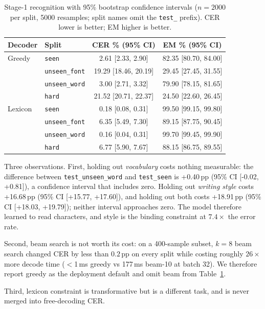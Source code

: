 \documentclass[conference]{IEEEtran}
\begin{document}
\begin{table}[t]
\caption{Stage-1 recognition with 95\% bootstrap confidence intervals
($n=2000$ per split, 5000 resamples; split names omit the \texttt{test\_}
prefix). CER lower is better; EM higher is better.}
\label{tab:stage1}
\centering
\footnotesize
\setlength{\tabcolsep}{3.5pt}
\begin{tabular}{@{}llcc@{}}
\toprule
Decoder & Split & CER \% (95\% CI) & EM \% (95\% CI) \\
\midrule
Greedy
 & \texttt{seen} & 2.61 [2.33, 2.90] & 82.35 [80.70, 84.00] \\
 & \texttt{unseen\_font} & 19.29 [18.46, 20.19] & 29.45 [27.45, 31.55] \\
 & \texttt{unseen\_word} & 3.00 [2.71, 3.32] & 79.90 [78.15, 81.65] \\
 & \texttt{hard} & 21.52 [20.71, 22.37] & 24.50 [22.60, 26.45] \\
\midrule
Lexicon
 & \texttt{seen} & 0.18 [0.08, 0.31] & 99.50 [99.15, 99.80] \\
 & \texttt{unseen\_font} & 6.35 [5.49, 7.30] & 89.15 [87.75, 90.45] \\
 & \texttt{unseen\_word} & 0.16 [0.04, 0.31] & 99.70 [99.45, 99.90] \\
 & \texttt{hard} & 6.77 [5.90, 7.67] & 88.15 [86.75, 89.55] \\
\bottomrule
\end{tabular}
\end{table}

Three observations. First, holding out \emph{vocabulary} costs nothing measurable: the difference between \texttt{test\_unseen\_word} and \texttt{test\_seen} is +0.40\,pp (95\% CI [-0.02, +0.81]), a confidence interval that includes zero. Holding out \emph{writing style} costs +16.68\,pp (95\% CI [+15.77, +17.60]), and holding out both costs +18.91\,pp (95\% CI [+18.03, +19.79]); neither interval approaches zero. The model therefore learned to read characters, and style is the binding constraint at $7.4\times$ the error rate.

Second, beam search is not worth its cost: on a 400-sample subset, $k=8$ beam search changed CER by less than $0.2$\,pp on every split while costing roughly $26\times$ more decode time ($<$1\,ms greedy vs 177\,ms beam-10 at batch 32). We therefore report greedy as the deployment default and omit beam from Table~\ref{tab:stage1}.

Third, lexicon constraint is transformative but is a different task, and is never merged into free-decoding CER.
\end{document}
